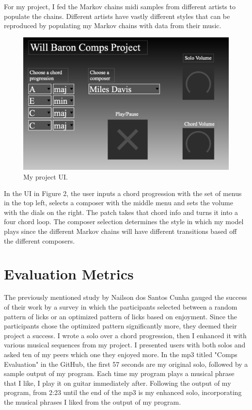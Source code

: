 \documentclass[10pt,twocolumn]{article}
\begin{document}
    For my project, I fed the Markov chains midi samples from different artists to populate the chains. Different artists have vastly different styles that can be reproduced by populating my Markov chains with data from their music.
    \begin{figure}[h]
        \centering
        \includegraphics[width=.95\linewidth]{ui.png}
        \caption{
            My project UI.
        }
        \label{fig2}
    \end{figure}
    In the UI in Figure 2, the user inputs a chord progression with the set of menus in the top left, selects a composer with the middle menu and sets the volume with the dials on the right. The patch takes that chord info and turns it into a four chord loop. The composer selection determines the style in which my model plays since the different Markov chains will have different transitions based off the different composers.

\section{Evaluation Metrics}
    
    The previously mentioned study by Nailson dos Santos Cunha gauged the success of their work by a survey in which the participants selected between a random pattern of licks or an optimized pattern of licks based on enjoyment. Since the participants chose the optimized pattern significantly more, they deemed their project a success. I wrote a solo over a chord progression, then I enhanced it with various musical sequences from my project. I presented users with both solos and asked ten of my peers which one they enjoyed more. In the mp3 titled "Comps Evaluation" in the GitHub, the first 57 seconds are my original solo, followed by a sample output of my program. Each time my program plays a musical phrase that I like, I play it on guitar immediately after. Following the output of my program, from  2:23 until the end of the mp3 is my enhanced solo, incorporating the musical phrases I liked from the output of my program.\newline
\end{document}
